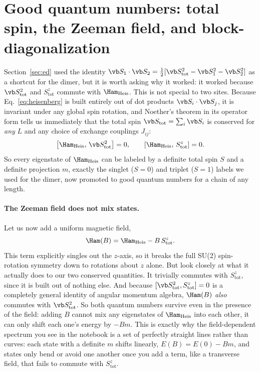 \documentclass[all_sessions.tex]{subfiles}
\begin{document}
\section{Good quantum numbers: total spin, the Zeeman field, and block-diagonalization}
\label{sec:quantumnumbers}
Section~\ref{sec:ed} used the identity $\vb S_1\cdot\vb S_2=\tfrac12[\vb S_{\mathrm{tot}}^2 - \vb
S_1^2-\vb S_2^2]$ as a shortcut for the dimer, but it is worth asking why it worked: it worked because
$\vb S_{\mathrm{tot}}^2$ and $S_{\mathrm{tot}}^z$ commute with $\Ham_{\mathrm{Heis}}$. This is not
special to two sites. Because Eq.~\eqref{eq:heisenberg} is built entirely out of dot products
$\vb S_i\cdot\vb S_j$, it is invariant under any global spin rotation, and Noether's theorem in its
operator form tells us immediately that the total spin $\vb S_{\mathrm{tot}}=\sum_i \vb S_i$ is
conserved for \emph{any} $L$ and any choice of exchange couplings $J_{ij}$:
\begin{equation}
  \left[\Ham_{\mathrm{Heis}},\, \vb S_{\mathrm{tot}}^2\right] = 0, \qquad
  \left[\Ham_{\mathrm{Heis}},\, S_{\mathrm{tot}}^z\right] = 0.
  \label{eq:conservation}
\end{equation}
So every eigenstate of $\Ham_{\mathrm{Heis}}$ can be labeled by a definite total spin $S$ and a definite
projection $m$, exactly the singlet ($S=0$) and triplet ($S=1$) labels we used for the dimer, now
promoted to good quantum numbers for a chain of any length.

\paragraph{The Zeeman field does not mix states.} Let us now add a uniform magnetic field,
\begin{equation}
  \Ham(B) = \Ham_{\mathrm{Heis}} - B\, S_{\mathrm{tot}}^z.
  \label{eq:zeeman}
\end{equation}
This term explicitly singles out the $z$-axis, so it breaks the full SU(2) spin-rotation symmetry down
to rotations about $z$ alone. But look closely at what it actually does to our two conserved quantities.
It trivially commutes with $S_{\mathrm{tot}}^z$, since it is built out of nothing else. And because
$[\vb S_{\mathrm{tot}}^2, S_{\mathrm{tot}}^z]=0$ is a completely general identity of angular momentum
algebra, $\Ham(B)$ \emph{also} commutes with $\vb S_{\mathrm{tot}}^2$. So both quantum numbers survive
even in the presence of the field: adding $B$ cannot mix any eigenstates of $\Ham_{\mathrm{Heis}}$ into
each other, it can only shift each one's energy by $-Bm$. This is exactly why the field-dependent
spectrum you see in the notebook is a set of perfectly straight lines rather than curves: each state
with a definite $m$ shifts linearly, $E(B)=E(0)-Bm$, and states only bend or avoid one another once you
add a term, like a transverse field, that fails to commute with $S_{\mathrm{tot}}^z$.
\end{document}
